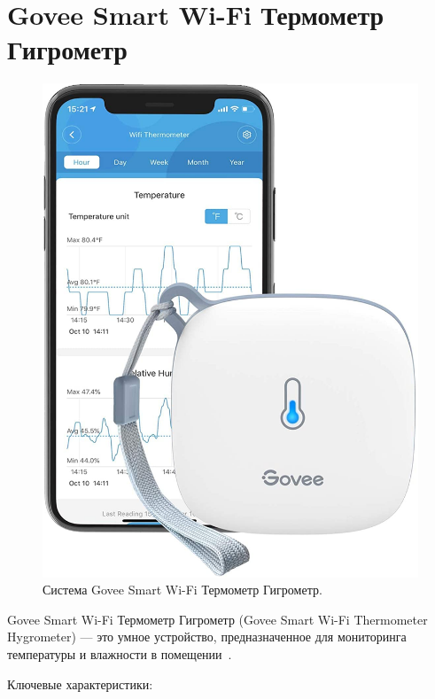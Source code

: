 \section{Govee Smart Wi-Fi Термометр Гигрометр}

\begin{figure}[H]
    \centering
    \includegraphics[scale=0.25]{images/GoveeSmartWiFi.png}
    \caption{Система Govee Smart Wi-Fi Термометр Гигрометр.}
    \label{fig:GoveeSmartWiFi}
\end{figure}

Govee Smart Wi-Fi Термометр Гигрометр (Govee Smart Wi-Fi Thermometer Hygrometer) --- это умное устройство, предназначенное для мониторинга температуры и влажности в помещении~\cite{Govee}.

Ключевые характеристики:

